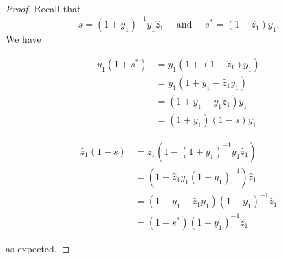 \documentclass[reqno]{amsart}
\theoremstyle{plain}
\theoremstyle{definition}
\theoremstyle{remark}
\newcommand{\z}{\widehat{z}}
\newcommand{\<}{\langle}
\renewcommand{\>}{\rangle}
\begin{document}
\begin{proof}    
    Recall that \[ s = (1 + y_1)^{-1} y_1 \z_1 \quad \text{ and } \quad s^* = (1 - \z_1) y_1. \]
    We have

    \begin{minipage}{0.48\textwidth}
        \begin{align*}
            y_1 (1 + s^*) & = y_1 (1 + (1 - \z_1) y_1) \\
            & = y_1 (1 + y_1 - \z_1 y_1) \\
            & = (1 + y_1 - y_1 \z_1) y_1 \\
            & = (1 + y_1) (1 - s) y_1
        \end{align*}      
    \end{minipage}%
    \hfill
    \begin{minipage}{0.48\textwidth}
        \begin{align*}
            \z_1 (1-s) & = \z_1 (1 - (1 + y_1)^{-1} y_1 \z_1) \\
            & = (1 - \z_1 y_1 (1 + y_1)^{-1}) \z_1 \\
            & = (1 + y_1 - \z_1 y_1) (1 + y_1)^{-1} \z_1 \\
            & = (1 + s^*) (1 + y_1)^{-1} \z_1
        \end{align*}        
    \end{minipage}

    as expected.
\end{proof}
\end{document}
